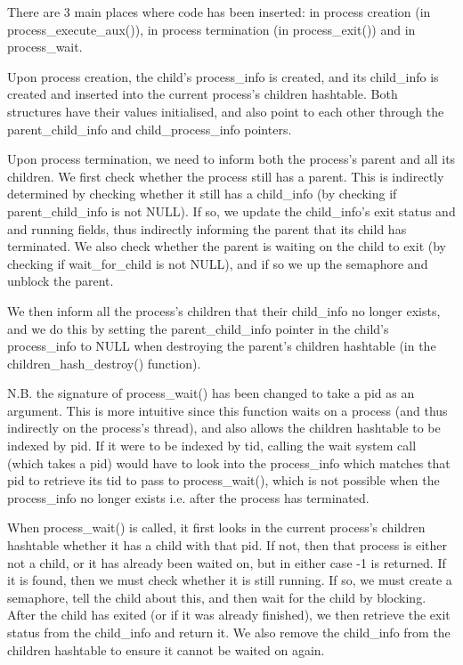 There are 3 main places where code has been inserted: in process creation (in process\_execute\_aux()), in process termination (in process\_exit()) and in process\_wait.

Upon process creation, the child's process\_info is created, and its child\_info is created and inserted into the current process's children hashtable. Both structures have their values initialised, and also point to each other through the parent\_child\_info and child\_process\_info pointers.

Upon process termination, we need to inform both the process's parent and all its children. We first check whether the process still has a parent. This is indirectly determined by checking whether it still has a child\_info (by checking if parent\_child\_info is not NULL). If so, we update the child\_info's exit status and and running fields, thus indirectly informing the parent that its child has terminated. We also check whether the parent is waiting on the child to exit (by checking if wait\_for\_child is not NULL), and if so we up the semaphore and unblock the parent.

We then inform all the process's children that their child\_info no longer exists, and we do this by setting the parent\_child\_info pointer in the child's process\_info to NULL when destroying the parent's children hashtable (in the children\_hash\_destroy() function).

N.B. the signature of process\_wait() has been changed to take a pid as an argument. This is more intuitive since this function waits on a process (and thus indirectly on the process's thread), and also allows the children hashtable to be indexed by pid. If it were to be indexed by tid, calling the wait system call (which takes a pid) would have to look into the process\_info which matches that pid to retrieve its tid to pass to process\_wait(), which is not possible when the process\_info no longer exists i.e. after the process has terminated.

When process\_wait() is called, it first looks in the current process's children hashtable whether it has a child with that pid. If not, then that process is either not a child, or it has already been waited on, but in either case -1 is returned. If it is found, then we must check whether it is still running. If so, we must create a semaphore, tell the child about this, and then wait for the child by blocking. After the child has exited (or if it was already finished), we then retrieve the exit status from the child\_info and return it. We also remove the child\_info from the children hashtable to ensure it cannot be waited on again.

